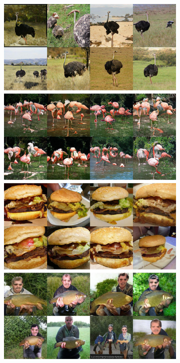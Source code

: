 \documentclass[12pt, a4paper]{article}
\begin{document}
\begin{figure}[ht]
    \begin{center}
    \begin{subfigure}[]{0.25\textwidth}
    \centerline{\includegraphics[width=\textwidth]{Images/samples/reflow_biggan-deep-256-t1.jpg}}

\end{subfigure}
\end{center}
\end{figure}
\end{document}
